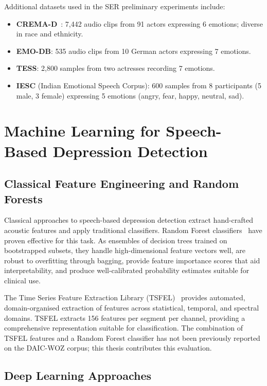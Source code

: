 Additional datasets used in the SER preliminary experiments include:
\begin{itemize}
    \item \textbf{CREMA-D}~\cite{Cao2014}: 7,442 audio clips from 91 actors expressing 6 emotions; diverse in race and ethnicity.
    \item \textbf{EMO-DB}: 535 audio clips from 10 German actors expressing 7 emotions.
    \item \textbf{TESS}: 2,800 samples from two actresses recording 7 emotions.
    \item \textbf{IESC} (Indian Emotional Speech Corpus): 600 samples from 8 participants (5 male, 3 female) expressing 5 emotions (angry, fear, happy, neutral, sad).
\end{itemize}

\section{Machine Learning for Speech-Based Depression Detection}

\subsection{Classical Feature Engineering and Random Forests}

Classical approaches to speech-based depression detection extract hand-crafted acoustic features and apply traditional classifiers. Random Forest classifiers~\cite{Rigatti2017} have proven effective for this task. As ensembles of decision trees trained on bootstrapped subsets, they handle high-dimensional feature vectors well, are robust to overfitting through bagging, provide feature importance scores that aid interpretability, and produce well-calibrated probability estimates suitable for clinical use.

The Time Series Feature Extraction Library (TSFEL)~\cite{TSFEL2020} provides automated, domain-organised extraction of features across statistical, temporal, and spectral domains. TSFEL extracts 156 features per segment per channel, providing a comprehensive representation suitable for classification. The combination of TSFEL features and a Random Forest classifier has not been previously reported on the DAIC-WOZ corpus; this thesis contributes this evaluation.

\subsection{Deep Learning Approaches}

